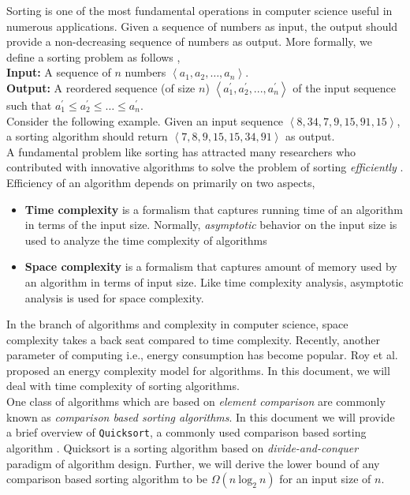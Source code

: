 \documentclass[a4paper,10pt]{article}
\begin{document}
\begin{multicols*}{2}
Sorting is one of the most fundamental operations in computer science useful in numerous applications. Given a sequence of numbers as input, the output should provide a non-decreasing sequence of numbers as output. More formally, we define a sorting problem as follows \cite{clrs},
\\
\textbf{Input:} A sequence of $n$ numbers $\left \langle a_1, a_2, \dots, a_n \right \rangle$.
\\
\textbf{Output:} A reordered sequence (of size $n$) $\left \langle a_1^{'}, a_2^{'}, ..., a_{n}^{'} \right \rangle$ of the input sequence such that $a_1^{'} \leq a_2^{'} \leq \dots \leq a_{n}^{'}$.
\\
Consider the following example. Given an input sequence $\left \langle 8, 34, 7, 9, 15, 91, 15 \right \rangle$, a sorting algorithm should return $\left \langle 7, 8, 9, 15, 15, 34, 91 \right \rangle$ as output.
\\
\hspace*{3mm} A fundamental problem like sorting has attracted many researchers who contributed with innovative algorithms to solve the problem of sorting \textit{efficiently} \cite{martin3}. Efficiency of an algorithm depends on primarily on two aspects,
\begin{itemize}
\item \textbf{Time complexity} is a formalism that captures running time of an algorithm in terms of the input size. Normally, \textit{asymptotic} behavior on the input size is used to analyze the time complexity of algorithms
\item \textbf{Space complexity} is a formalism that captures amount of memory used by an algorithm in terms of input size. Like time complexity analysis, asymptotic analysis is used for space complexity.
\end{itemize}

In the branch of algorithms and complexity in computer science, space complexity takes a back seat compared to time complexity. Recently, another parameter of computing i.e., energy consumption has become popular. Roy et al. \cite{roy4} proposed an energy complexity model for algorithms. In this document, we will deal with time complexity of sorting algorithms.\\
    One class of algorithms which are based on \textit{element comparison} are commonly known as \textit{comparison based sorting algorithms}. In this document we will provide a brief overview of \texttt{Quicksort}, a commonly used comparison based sorting algorithm \cite{hoare2}. Quicksort is a sorting algorithm based on \textit{divide-and-conquer} paradigm of algorithm design. Further, we will derive the lower bound of any comparison based sorting algorithm to be $\Omega(n\: \text{log}_2\: n) $ for an input size of $n$.


\end{multicols*}
\end{document}
